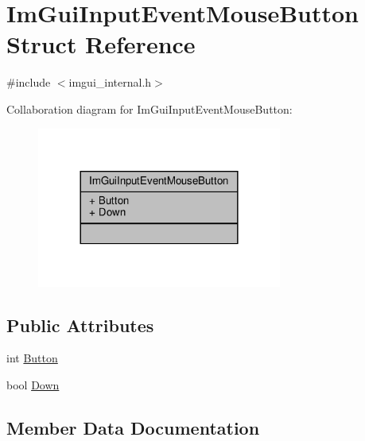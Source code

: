 \hypertarget{structImGuiInputEventMouseButton}{}\section{Im\+Gui\+Input\+Event\+Mouse\+Button Struct Reference}
\label{structImGuiInputEventMouseButton}


{\ttfamily \#include $<$imgui\+\_\+internal.\+h$>$}



Collaboration diagram for Im\+Gui\+Input\+Event\+Mouse\+Button\+:
\nopagebreak
\begin{figure}[H]
\begin{center}
\leavevmode
\includegraphics[width=228pt]{structImGuiInputEventMouseButton__coll__graph}
\end{center}
\end{figure}
\subsection*{Public Attributes}
\begin{DoxyCompactItemize}
\item 
int \hyperlink{structImGuiInputEventMouseButton_a6ecd75641eda3da1c42f977cd705ff03}{Button}
\item 
bool \hyperlink{structImGuiInputEventMouseButton_a9a669f2168a719da17c26dc3ad154d65}{Down}
\end{DoxyCompactItemize}


\subsection{Member Data Documentation}
\mbox{\label{structImGuiInputEventMouseButton_a6ecd75641eda3da1c42f977cd705ff03}} 
